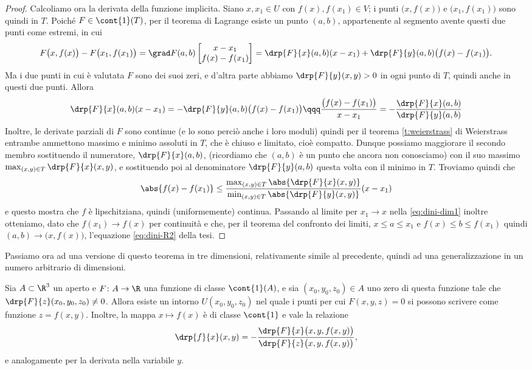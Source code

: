 \begin{proof}
	Calcoliamo ora la derivata della funzione implicita.
	Siano $x,x_1\in U$ con $f(x),f(x_1)\in V$; i punti $\big(x,f(x)\big)$ e $\big(x_1,f(x_1)\big)$ sono quindi in $T$.
	Poiché $F\in\cont{1}(T)$, per il teorema di Lagrange esiste un punto $(a,b)$, appartenente al segmento avente questi due punti come estremi, in cui
	\begin{equation}
		F\big(x,f(x)\big)-F\big(x_1,f(x_1)\big)=\grad F(a,b)
		\begin{bmatrix}
			x-x_1\\
			f(x)-f(x_1)
		\end{bmatrix}
		=\drp{F}{x}(a,b)(x-x_1)+\drp{F}{y}(a,b)\big(f(x)-f(x_1)\big).
	\end{equation}
	Ma i due punti in cui è valutata $F$ sono dei suoi zeri, e d'altra parte abbiamo $\drp{F}{y}(x,y)>0$ in ogni punto di $T$, quindi anche in questi due punti.
	Allora
	\begin{equation} \label{eq:dini-dim1}
		\drp{F}{x}(a,b)(x-x_1)=-\drp{F}{y}(a,b)\big(f(x)-f(x_1)\big)\qqq
		\frac{\big(f(x)-f(x_1)\big)}{x-x_1}=-\dfrac{\drp{F}{x}(a,b)}{\drp{F}{y}(a,b)}
	\end{equation}
	Inoltre, le derivate parziali di $F$ sono continue (e lo sono perciò anche i loro moduli) quindi per il teorema \ref{t:weierstrass} di Weierstrass entrambe ammettono massimo e minimo assoluti in $T$, che è chiuso e limitato, cioè compatto.
	Dunque possiamo maggiorare il secondo membro sostituendo il numeratore, $\drp{F}{x}(a,b)$, (ricordiamo che $(a,b)$ è un punto che ancora non conosciamo) con il suo massimo $\max_{(x,y)\in T}\drp{F}{x}(x,y)$, e sostituendo poi al denominatore $\drp{F}{y}(a,b)$ questa volta con il minimo in $T$.
	Troviamo quindi che
	\begin{equation}
		\abs{f(x)-f(x_1)}\leq\frac{\max_{(x,y)\in T}\abs{\drp{F}{x}(x,y)}}{\min_{(x,y)\in T}\abs{\drp{F}{y}(x,y)}}(x-x_1)
	\end{equation}
	e questo mostra che $f$ è lipschitziana, quindi (uniformemente) continua.
	Passando al limite per $x_1\to x$ nella \eqref{eq:dini-dim1} inoltre otteniamo, dato che $f(x_1)\to f(x)$ per continuità e che, per il teorema del confronto dei limiti, $x\leq a\leq x_1$ e $f(x)\leq b\leq f(x_1)$ quindi $(a,b)\to\big(x,f(x)\big)$, l'equazione \eqref{eq:dini-R2} della tesi.
\end{proof}
Passiamo ora ad una versione di questo teorema in tre dimensioni, relativamente simile al precedente, quindi ad una generalizzazione in un numero arbitrario di dimensioni.
\begin{teorema} \label{t:dini-R3}
	Sia $A\subset\R^3$ un aperto e $F\colon A\to\R$ una funzione di classe $\cont{1}(A)$, e sia $(x_0,y_0,z_0)\in A$ uno zero di questa funzione tale che $\drp{F}{z}(x_0,y_0,z_0)\neq 0$.
	Allora esiste un intorno $U(x_0,y_0,z_0)$ nel quale i punti per cui $F(x,y,z)=0$ si possono scrivere come funzione $z=f(x,y)$.
	Inoltre, la mappa $x\mapsto f(x)$ è di classe $\cont{1}$ e vale la relazione
	\begin{equation}
		\drp{f}{x}(x,y)=-\dfrac{\drp{F}{x}\big(x,y,f(x,y)\big)}{\drp{F}{z}\big(x,y,f(x,y)\big)},
	\label{eq:dini-R3}
\end{equation}
	e analogamente per la derivata nella variabile $y$.
\end{teorema}
